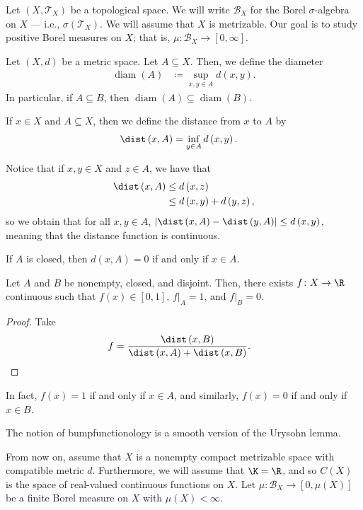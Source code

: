 \documentclass[10pt]{mypackage}
\renewcommand{\coloneq}{\coloneqq}
\DeclareMathOperator{\diam}{diam}
\begin{document}
Let $\left( X,\mathcal{T}_X \right)$ be a topological space. We will write $\mathcal{B}_X$ for the Borel $\sigma$-algebra on $X$ --- i.e., $\sigma\left( \mathcal{T}_X \right)$. We will assume that $X$ is metrizable. Our goal is to study positive Borel measures on $X$; that is, $\mu\colon \mathcal{B}_X\to [0,\infty]$.
\begin{definition}
  Let $\left( X,d \right)$ be a metric space. Let $A\subseteq X$. Then, we define the diameter
  \begin{align*}
    \diam\left( A \right) &\coloneq \sup_{x,y\in A} d\left( x,y \right).
  \end{align*}
  In particular, if $A\subseteq B$, then $\diam\left( A \right)\subseteq \diam\left( B \right)$.

  If $x\in X$ and $A\subseteq X$, then we define the distance from $x$ to $A$ by 
  \begin{align*}
    \dist\left( x,A \right) &= \inf_{y\in A}d\left( x,y \right).
  \end{align*}
\end{definition}
Notice that if $x,y\in X$ and $z\in A$, we have that 
\begin{align*}
  \dist\left( x,A \right) &\leq d\left( x,z \right)\\
                          &\leq d\left( x,y \right) + d\left( y,z \right),
\end{align*}
so we obtain that for all $x,y\in A$, $\left\vert \dist\left( x,A \right)-\dist\left( y,A \right) \right\vert\leq d\left( x,y \right)$, meaning that the distance function is continuous.
\begin{proposition}
  If $A$ is closed, then $d\left( x,A \right) = 0$ if and only if $x\in A$.
\end{proposition}
\begin{proposition}
  Let $A$ and $B$ be nonempty, closed, and disjoint. Then, there exists $f\colon X\to\R$ continuous such that $f(x)\in [0,1]$, $f|_{A} = 1$, and $f|_{B} = 0$.
\end{proposition}
\begin{proof}
  Take
  \begin{align*}
    f &= \frac{\dist\left( x,B \right)}{\dist\left( x,A \right) + \dist\left( x,B \right)}.
  \end{align*}
\end{proof}
\begin{remark}
  In fact, $f(x) = 1$ if and only if $x\in A$, and similarly, $f(x) = 0$ if and only if $x\in B$.

  The notion of bumpfunctionology is a smooth version of the Urysohn lemma.
\end{remark}
From now on, assume that $X$ is a nonempty compact metrizable space with compatible metric $d$. Furthermore, we will assume that $\K = \R$, and so $C(X)$ is the space of real-valued continuous functions on $X$. Let $\mu\colon \mathcal{B}_X\to [0,\mu(X)]$ be a finite Borel measure on $X$ with $\mu(X) < \infty$.
\end{document}
